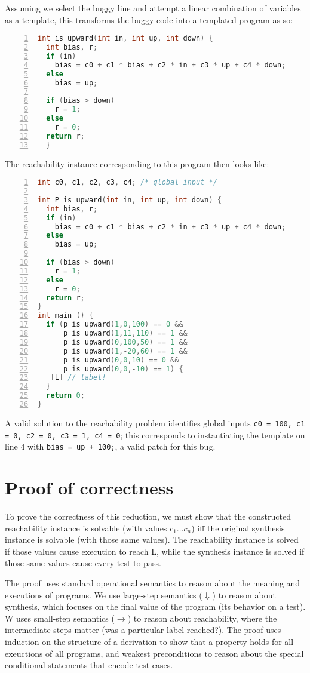 \documentclass[11pt]{article}
\begin{document}
Assuming we select the buggy line and attempt a linear combination of variables
as a template, this transforms the buggy code into a templated program as so:


\begin{lstlisting}[language=C,basicstyle=\footnotesize,numbers=left]
int is_upward(int in, int up, int down) {
  int bias, r;
  if (in)
    bias = c0 + c1 * bias + c2 * in + c3 * up + c4 * down;
  else
    bias = up;
  
  if (bias > down)
    r = 1;
  else
    r = 0;
  return r;
  }
\end{lstlisting}


The reachability instance corresponding to this program then looks like:



\begin{lstlisting}[language=C,basicstyle=\footnotesize,numbers=left]
int c0, c1, c2, c3, c4; /* global input */

int P_is_upward(int in, int up, int down) {
  int bias, r;
  if (in)
    bias = c0 + c1 * bias + c2 * in + c3 * up + c4 * down;
  else
    bias = up;
  
  if (bias > down)
    r = 1;
  else
    r = 0;
  return r;
}
int main () {
  if (p_is_upward(1,0,100) == 0 &&
      p_is_upward(1,11,110) == 1 &&
      p_is_upward(0,100,50) == 1 &&
      p_is_upward(1,-20,60) == 1 &&
      p_is_upward(0,0,10) == 0 &&
      p_is_upward(0,0,-10) == 1) {
   [L] // label!
  } 
  return 0;
}
\end{lstlisting}

A valid solution to the reachability problem identifies global inputs \texttt{c0
  = 100, c1 = 0, c2 = 0, c3 = 1, c4 = 0}; this corresponds to instantiating the
template on line 4 with \texttt{bias = up + 100;}, a valid patch for this bug. 


\section{Proof of correctness}

To prove the correctness of this reduction, we must show that the constructed
reachability instance is solvable (with values $c_1 \ldots c_n$) iff the original
synthesis instance is solvable (with those same values). 
The reachability instance is solved if those values cause execution to reach L,
while the synthesis instance is solved if those same values cause every test to
pass.

The proof uses standard operational semantics to reason about the meaning and
executions of programs. We use large-step semantics ($\Downarrow$) to reason
about synthesis, which focuses on the final value of the program (its behavior
on a test). W uses small-step semantics ($\rightarrow$) to reason about
reachability, where the intermediate steps matter (was a particular label
reached?). The proof uses induction on the structure of a derivation to show
that a property holds for all exeuctions of all programs, and weakest
preconditions to reason about the special conditional statements that encode
test cases.
\end{document}
